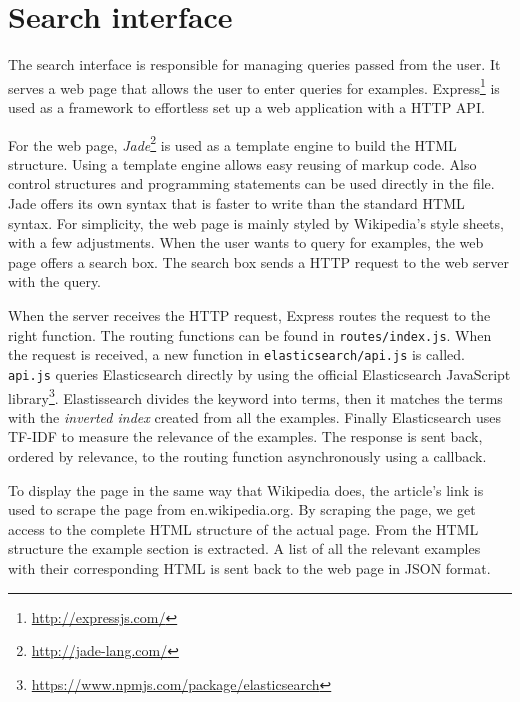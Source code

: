 \section{Search interface}

The search interface is responsible for managing queries passed from the user. It serves a web page that allows the user to enter queries for examples. Express\footnote{\url{http://expressjs.com/}} is used as a framework to effortless set up a web application with a HTTP API.

For the web page, \textit{Jade}\footnote{\url{http://jade-lang.com/}} is used as a template engine to build the HTML structure. Using a template engine allows easy reusing of markup code. Also control structures and programming statements can be used directly in the file. Jade offers its own syntax that is faster to write than the standard HTML syntax. For simplicity, the web page is mainly styled by Wikipedia's style sheets, with a few adjustments. When the user wants to query for examples, the web page offers a search box. The search box sends a HTTP request to the web server with the query.

When the server receives the HTTP request, Express routes the request to the right function. The routing functions can be found in \texttt{routes/index.js}. 
When the request is received, a new function in \texttt{elasticsearch/api.js} is called. \texttt{api.js} queries Elasticsearch directly by using the official Elasticsearch JavaScript  library\footnote{\url{https://www.npmjs.com/package/elasticsearch}}. Elastissearch divides the keyword into terms, then it matches the terms with the \textit{inverted index} created from all the examples. Finally Elasticsearch uses TF-IDF to measure the relevance of the examples. The response is sent back, ordered by relevance, to the routing function asynchronously using a callback.

To display the page in the same way that Wikipedia does, the article's link is used to scrape the page from en.wikipedia.org. By scraping the page, we get access to the complete HTML structure of the actual page. From the HTML structure the example section is extracted. A list of all the relevant examples with their corresponding HTML is sent back to the web page in JSON format. 


